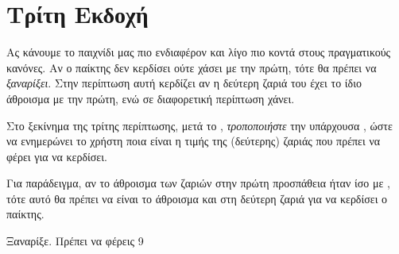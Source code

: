 \documentclass[a4paper,11pt,oneside]{book}
\begin{document}
\begin{step}








\end{step}

\section{Τρίτη Εκδοχή}

Ας κάνουμε το παιχνίδι μας πιο ενδιαφέρον και λίγο πιο κοντά στους πραγματικούς κανόνες. Αν ο παίκτης δεν κερδίσει ούτε χάσει με την πρώτη, τότε θα πρέπει να \emph{ξαναρίξει}. Στην περίπτωση αυτή κερδίζει αν η δεύτερη ζαριά του έχει το ίδιο άθροισμα με την πρώτη, ενώ σε διαφορετική περίπτωση χάνει.

\begin{step}
Στο ξεκίνημα της τρίτης περίπτωσης, μετά το , \emph{τροποποιήστε} την υπάρχουσα , ώστε να ενημερώνει το χρήστη ποια είναι η τιμής της (δεύτερης) ζαριάς που πρέπει να φέρει για να κερδίσει. 

Για παράδειγμα, αν το άθροισμα των ζαριών στην πρώτη προσπάθεια ήταν ίσο με , τότε αυτό θα πρέπει να είναι το άθροισμα και στη δεύτερη ζαριά για να κερδίσει ο παίκτης.

\marginnote[16pt]{\iconcomputer}
\begin{pyterm}
Ξαναρίξε. Πρέπει να φέρεις 9
\end{pyterm}
\end{step}
\end{document}
